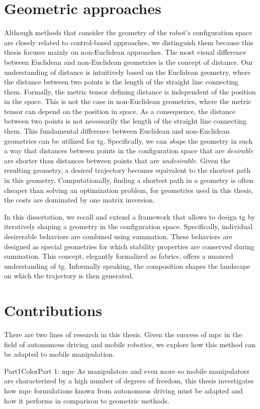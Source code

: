 \section{Geometric approaches}
\label{sec:geometries_in_trajectory_generation}

Although methods that consider the geometry of the robot's 
configuration space are closely related to control-based
approaches, we distinguish them because this thesis focuses
mainly on non-Euclidean approaches. 
The most visual
difference between Euclidean and non-Euclidean geometries is
the concept of distance. Our understanding of distance is 
intuitively based on the Euclidean geometry, where the
distance between two points is the length of the straight
line connecting them. Formally, the metric tensor defining
distance is independent of the position in the space. This
is not the case in non-Euclidean geometries, where the
metric tensor can depend on the position in space.
As a consequence, the distance between two points is not
necessarily the length of the straight line connecting them.
This fundamental difference between Euclidean and
non-Euclidean geometries can be utilized for \ac{tg}.
Specifically, we can \textit{shape} the geometry in such a
way that distances between points in the configuration space
that are \textit{desirable} are shorter than distances
between points that are \textit{undesirable}. Given the
resulting geometry, a desired trajectory becomes
equivalent to the shortest path in this geometry.
Computationally, finding a shortest path in a geometry is 
often cheaper than solving an optimization problem, for
geometries used in this thesis, the costs are dominated by
one matrix inversion.

In this dissertation, we recall and extend a framework that
allows to design \ac{tg} by iteratively shaping a geometry
in the configuration space. Specifically, individual
desirerable behaviors are combined using summation. These
behaviors are designed as special geometries for which
stability properties are conserved during summation. This
concept, elegantly formalized as \ac{fabrics}, offers a
nuanced understanding of \ac{tg}. Informally speaking, the
composition shapes the landscape on which the trajectory is
then generated.

\section{Contributions}
\label{sec:contributions}

There are two lines of research in this thesis. Given the
success of \ac{mpc} in the field of autonomous driving and
mobile robotics, we explore how this method can be adapted
to mobile manipulation. 
%
\begin{textbox}{Part1Color}{Part 1: \acl{mpc}}
  As manipulators and even more so mobile manipulators are
  characterized by a high number of degrees of freedom, this
  thesis investigates how \ac{mpc} formulations known from
  autonomous driving must be adapted and how
  it performs in comparison to geometric methods.
\end{textbox}
%

